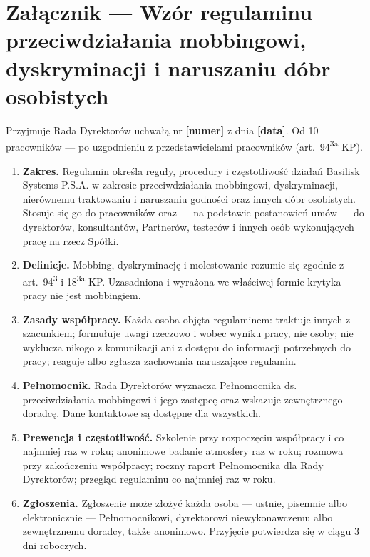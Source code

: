 \documentclass[11pt,a4paper]{report}
\newcommand{\field}[1]{\textbf{[#1]}}
\begin{document}
\section*{Załącznik --- Wzór regulaminu przeciwdziałania mobbingowi, dyskryminacji i naruszaniu dóbr osobistych}

{\small Przyjmuje Rada Dyrektorów uchwałą nr \field{numer} z dnia \field{data}. Od 10 pracowników --- po uzgodnieniu z przedstawicielami pracowników (art.~94\textsuperscript{3a} KP).\par}

\begin{enumerate}
  \item[§~1.] \textbf{Zakres.} Regulamin określa reguły, procedury i częstotliwość działań Basilisk Systems P.S.A. w zakresie przeciwdziałania mobbingowi, dyskryminacji, nierównemu traktowaniu i naruszaniu godności oraz innych dóbr osobistych. Stosuje się go do pracowników oraz --- na podstawie postanowień umów --- do dyrektorów, konsultantów, Partnerów, testerów i innych osób wykonujących pracę na rzecz Spółki.
  \item[§~2.] \textbf{Definicje.} Mobbing, dyskryminację i molestowanie rozumie się zgodnie z art.~94\textsuperscript{3} i 18\textsuperscript{3a} KP. Uzasadniona i wyrażona we właściwej formie krytyka pracy nie jest mobbingiem.
  \item[§~3.] \textbf{Zasady współpracy.} Każda osoba objęta regulaminem: traktuje innych z szacunkiem; formułuje uwagi rzeczowo i wobec wyniku pracy, nie osoby; nie wyklucza nikogo z komunikacji ani z dostępu do informacji potrzebnych do pracy; reaguje albo zgłasza zachowania naruszające regulamin.
  \item[§~4.] \textbf{Pełnomocnik.} Rada Dyrektorów wyznacza Pełnomocnika ds. przeciwdziałania mobbingowi i jego zastępcę oraz wskazuje zewnętrznego doradcę. Dane kontaktowe są dostępne dla wszystkich.
  \item[§~5.] \textbf{Prewencja i częstotliwość.} Szkolenie przy rozpoczęciu współpracy i co najmniej raz w roku; anonimowe badanie atmosfery raz w roku; rozmowa przy zakończeniu współpracy; roczny raport Pełnomocnika dla Rady Dyrektorów; przegląd regulaminu co najmniej raz w roku.
  \item[§~6.] \textbf{Zgłoszenia.} Zgłoszenie może złożyć każda osoba --- ustnie, pisemnie albo elektronicznie --- Pełnomocnikowi, dyrektorowi niewykonawczemu albo zewnętrznemu doradcy, także anonimowo. Przyjęcie potwierdza się w ciągu 3 dni roboczych.

\end{enumerate}
\end{document}
